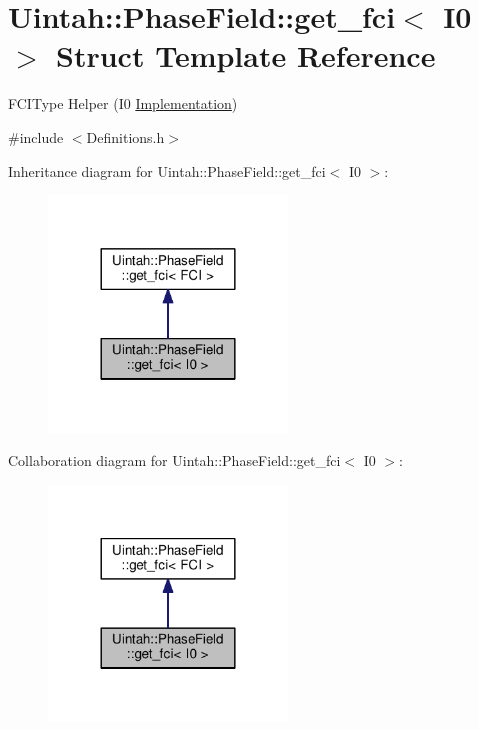 \hypertarget{structUintah_1_1PhaseField_1_1get__fci_3_01I0_01_4}{}\section{Uintah\+:\+:Phase\+Field\+:\+:get\+\_\+fci$<$ I0 $>$ Struct Template Reference}
\label{structUintah_1_1PhaseField_1_1get__fci_3_01I0_01_4}


F\+C\+I\+Type Helper (I0 \hyperlink{classUintah_1_1PhaseField_1_1Implementation}{Implementation})  




{\ttfamily \#include $<$Definitions.\+h$>$}



Inheritance diagram for Uintah\+:\+:Phase\+Field\+:\+:get\+\_\+fci$<$ I0 $>$\+:\nopagebreak
\begin{figure}[H]
\begin{center}
\leavevmode
\includegraphics[width=180pt]{structUintah_1_1PhaseField_1_1get__fci_3_01I0_01_4__inherit__graph}
\end{center}
\end{figure}


Collaboration diagram for Uintah\+:\+:Phase\+Field\+:\+:get\+\_\+fci$<$ I0 $>$\+:\nopagebreak
\begin{figure}[H]
\begin{center}
\leavevmode
\includegraphics[width=180pt]{structUintah_1_1PhaseField_1_1get__fci_3_01I0_01_4__coll__graph}
\end{center}
\end{figure}

